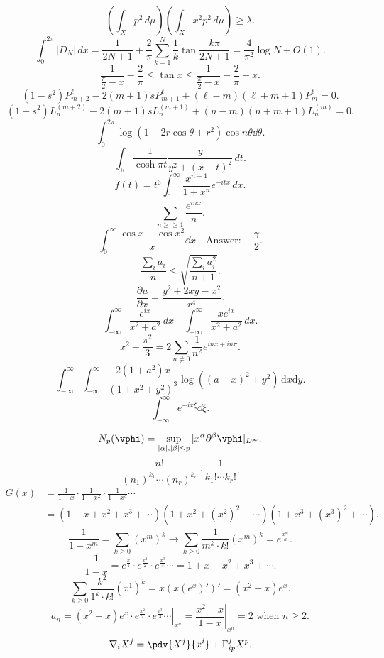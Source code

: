 \documentclass[12pt]{article}
\begin{document}
\[
  (\int_X p^2\,d\mu)(\int_X x^2 p^2\,d\mu)\ge \lambda
.\]
\[
  \int_0^{2\pi} |D_N|\,dx=\frac{1}{2N+1}+\frac{2}{\pi}\sum_{k=1}^N \frac{1}{k}\tan \frac{k\pi}{2N+1}=\frac{4}{\pi^2}\log N+O(1)
.\]
\[
  \frac{1}{\frac{\pi}{2}-x}-\frac{2}{\pi}\le \tan x\le \frac{1}{\frac{\pi}{2}-x}-\frac{2}{\pi}+x
.\]
\[
  (1-s^2)P_{m+2}^\ell-2(m+1)sP_{m+1}^\ell+(\ell-m)(\ell+m+1)P_m^\ell=0
.\]
\[
  (1-s^2) L_n^{(m+2)}-2(m+1)sL_n^{(m+1)}+(n-m)(n+m+1)L_n^{(m)}=0
.\]
\[
  \int_0^{2\pi}\log(1-2r\cos\theta+r^2)\cos n\theta\dd{\theta}
.\]
\[
  \int_{\mathbb{R}}\frac{1}{\cosh\pi t}\frac{y}{y^2+(x-t)^2}\,dt
.\]
\[
  f(t)=t^6 \int_0^\infty \frac{x^{n-1}}{1+x^n}e^{-itx}\,dx
.\]
\[
  \sum_{n\ge\geqslant 1} \frac{e^{inx}}{n}
.\]
\[
  \int_{0}^{\infty}\frac{\cos x-\cos x^2}{x}\dd{x}
  \quad\text{Answer:} -\frac{\gamma}{2}
.\]
\[
  \frac{\sum_i a_i}{n} \le \sqrt{\frac{\sum_i a_i^2}{n+1}}
.\]
\[
  \frac{\partial u}{\partial x}= \frac{y^2+2xy-x^2}{r^4}
.\]
\[
  \int_{-\infty}^\infty \frac{e^{ix}}{x^2+a^2}\,dx \quad \int_{-\infty}^\infty \frac{xe^{ix}}{x^2+a^2}\,dx
.\]
\[
  x^2- \frac{\pi^2}{3}=2\sum_{n\neq 0} \frac{1}{n^2}e^{inx+in\pi}
.\]
\[
  \int_{-\infty}^\infty\int_{-\infty}^\infty
  \frac{2(1+a^2)x}{(1+x^2+y^2)^3}\log((a-x)^2+y^2)
  \,\mathrm{d}x\mathrm{d}y
.\]
\[
  \int_{-\infty}^{\infty}e^{-ix\xi}\dd\xi
.\]

\[
  N_p(\vphi)=\sup_{|\alpha|,|\beta|\le p}|x^\alpha\partial^\beta\vphi|_{L^\infty}
.\]
\[
  \frac{n!}{(n_1)^{k_1}\cdots (n_r)^{k_r}}\cdot \frac{1}{k_1!\cdots k_r!}
.\]
\begin{align*}
  G(x) & =\frac{1}{1-x}\cdot \frac{1}{1-x^2}\cdot \frac{1}{1-x^3}\cdots        \\
       & = (1+x+x^2+x^3+\cdots )(1+x^2+(x^2)^2+\cdots )(1+x^3+(x^3)^2+\cdots )
.\end{align*}
\[
  \frac{1}{1-x^m}=\sum_{k\ge 0}(x^m)^k \to \sum_{k\ge 0}\frac{1}{m^k\cdot k!}(x^m)^k
  =e^{\frac{x^m}{k}}
.\]
\[
  \frac{1}{1-x}=e^{\frac{x}{1}}\cdot e^{\frac{x^2}{2}}\cdot e^{\frac{x^3}{3}}\cdots
  =1+x+x^2+x^3+\cdots
.\]
\[
  \sum_{k\ge 0}\frac{k^2}{1^k\cdot k!}(x^1)^k=x(x(e^x)')'=(x^2+x)e^x
.\]
\[
  a_n=\left.(x^2+x)e^x\cdot e^{\frac{x^2}{2}}\cdot e^{\frac{x^3}{3}}\cdots\right|_{x^n}
  =\left.\frac{x^2+x}{1-x}\right|_{x^n}=2\text{ when }n\ge 2
.\]
\[
  \nabla_i X^j=\pdv{X^j}{x^i}+\Gamma_{ip}^j X^p
.\] 

\printbibliography{}
\end{document}

